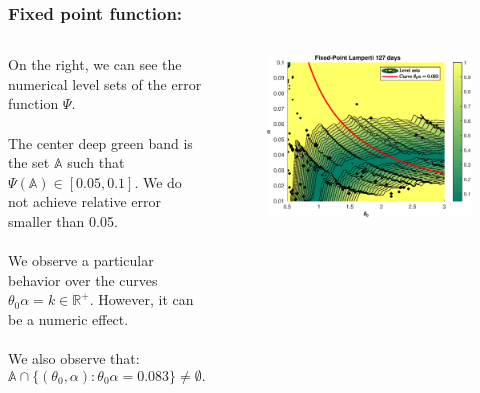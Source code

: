 \documentclass[aspectratio=169]{beamer}\usepackage[utf8]{inputenc}
\newcommand{\R}{\mathbb{R}}
\begin{document}

\begin{frame}\frametitle{Fixed point function:}

\begin{columns}

On the right, we can see the numerical level sets of the error function $\Psi$.\\
\quad\\
The center deep green band is the set $\mathbb{A}$ such that $\Psi(\mathbb{A})\in[0.05,0.1]$. We do not achieve relative error smaller than 0.05.\\
\quad\\
We observe a particular behavior over the curves $\theta_0\alpha=k\in\R^+$. However, it can be a numeric effect.\\
\quad\\
We also observe that: $$\mathbb{A}\cap\{(\theta_0,\alpha):\theta_0\alpha=0.083\}\neq\emptyset.$$

\begin{figure}[ht!]
\centering
\includegraphics[width=1\textwidth]{../../MATLAB_Files/Results/likelihood/lamperti/Log-Likelihood.eps}
\end{figure}

\end{columns}

\end{frame}

\end{document}
